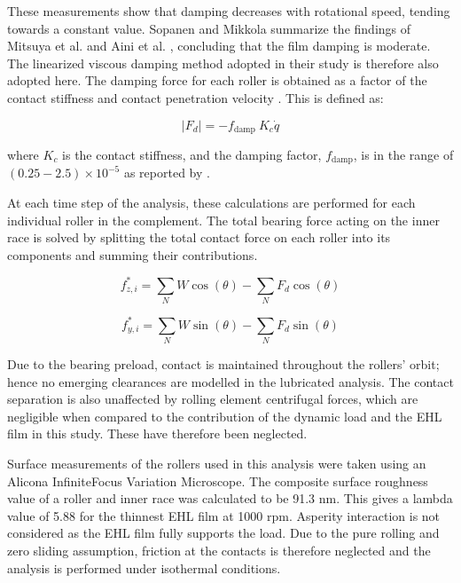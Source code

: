These measurements show that damping decreases with rotational speed, tending towards a constant value. Sopanen and Mikkola \cite{Sopanen2003_1} summarize the findings of Mitsuya et al. \cite{Mitsuya1992} and Aini et al. \cite{Aini2002}, concluding that the film damping is moderate. The linearized viscous damping method adopted in their study is therefore also adopted here. The damping force for each roller is obtained as a factor of the contact stiffness and contact penetration velocity \cite{Kramer1993}. This is defined as:

\begin{equation}\label{Kramer damping}
	\left|F_d\right|=-f_{\text {damp }} K_c \dot{q}
\end{equation}

where $K_c$ is the contact stiffness, and the damping factor, $f_{\text {damp}}$, is in the range of $(0.25-2.5) \times 10^{-5}$ as reported by \cite{Kramer1993}.

At each time step of the analysis, these calculations are performed for each individual roller in the complement. The total bearing force acting on the inner race is solved by splitting the total contact force on each roller into its components and summing their contributions.

\begin{equation}\label{Total bearing force z flexitribo}
	f_{z, i}^*=\sum_N W \cos (\theta)-\sum_N F_d \cos (\theta)
\end{equation}

\begin{equation}\label{Total bearing force y flexitribo}
	f_{y, i}^*=\sum_N W \sin (\theta)-\sum_N F_d \sin (\theta)
\end{equation}

Due to the bearing preload, contact is maintained throughout the rollers’ orbit; hence no emerging clearances are modelled in the lubricated analysis. The contact separation is also unaffected by rolling element centrifugal forces, which are negligible when compared to the contribution of the dynamic load and the EHL film in this study. These have therefore been neglected.

Surface measurements of the rollers used in this analysis were taken using an Alicona InfiniteFocus Variation Microscope. The composite surface roughness value of a roller and inner race was calculated to be 91.3 nm. This gives a lambda value of 5.88 for the thinnest EHL film at 1000 rpm. Asperity interaction is not considered as the EHL film fully supports the load. Due to the pure rolling and zero sliding assumption, friction at the contacts is therefore neglected and the analysis is performed under isothermal conditions. 

